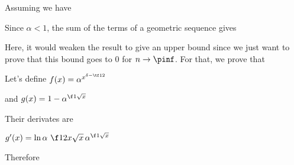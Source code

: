 Assuming we have


\noindent Since $\alpha < 1$, the sum of the terms of a geometric sequence gives


\noindent Here, it would weaken the result to give an upper bound since
we just want to prove that this bound goes to 0 for $n\rightarrow\pinf$.
For that, we prove that

\leftcenters
    {Let's define}
    {$ f(x) = \alpha^{ x^ { \delta - \tf12 } } $}

\leftcenters
    {and}
    {$ g(x) = 1 - \alpha^{ \f 1 { \sqrt{x} } } $}

\noindent Their derivates are


    {$ g'(x) 
        =  \ln \alpha\,\, \f 1 {2x\sqrt{x}}\, \alpha ^ {\f 1 {\sqrt{x}}} $}

\noindent Therefore

                    
